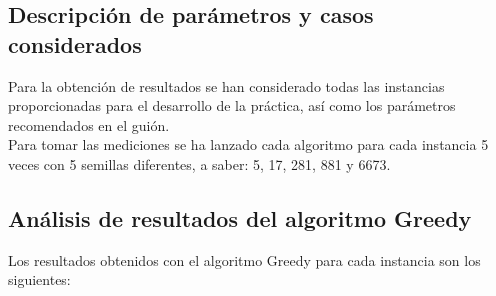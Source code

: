 \documentclass[11pt,a4paper]{article}
\begin{document}
	\subsection{Descripción de parámetros y casos considerados}
	
	\noindent Para la obtención de resultados se han considerado todas las instancias proporcionadas para el desarrollo de la práctica, así como los parámetros recomendados en el guión.\\
	
	\noindent Para tomar las mediciones se ha lanzado cada algoritmo para cada instancia 5 veces con 5 semillas diferentes, a saber: 5, 17, 281, 881 y 6673.\\
	
	\subsection{Análisis de resultados del algoritmo Greedy}
	
	\noindent Los resultados obtenidos con el algoritmo Greedy para cada instancia son los siguientes:\\
	
\end{document}
